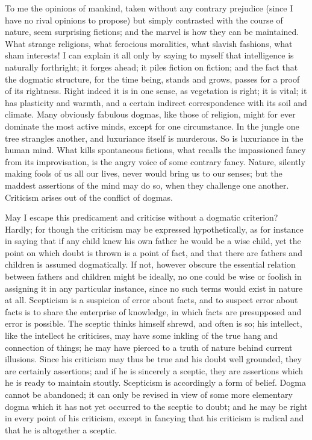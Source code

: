 To me the opinions of mankind, taken without any contrary prejudice
(since I have no rival opinions to propose) but simply contrasted with
the course of nature, seem surprising fictions; and the marvel is how
they can be maintained. What strange religions, what ferocious
moralities, what slavish fashions, what sham interests! I can explain
it all only by saying to myself that intelligence is naturally
forthright; it forges ahead; it piles fiction on fiction; and the fact
that the dogmatic structure, for the time being, stands and grows,
passes for a proof of its rightness. Right indeed it is in one sense,
as vegetation is right; it is vital; it has plasticity and warmth, and
a certain  indirect correspondence with its soil and climate.
Many obviously fabulous dogmas, like those of religion, might for ever
dominate the most active minds, except for one circumstance. In the
jungle one tree strangles another, and luxuriance itself is murderous.
So is luxuriance in the human mind. What kills spontaneous fictions,
what recalls the impassioned fancy from its improvisation, is the
angry voice of some contrary fancy. Nature, silently making fools of
us all our lives, never would bring us to our senses; but the maddest
assertions of the mind may do so, when they challenge one another.
Criticism arises out of the conflict of dogmas.

May I escape this predicament and criticise without a dogmatic
criterion? Hardly; for though the criticism may be expressed
hypothetically, as for instance in saying that if any child knew his
own father he would be a wise child, yet the point on which doubt is
thrown is a point of fact, and that there are fathers and children is
assumed dogmatically. If not, however obscure the essential relation
between fathers and children might be ideally, no one could be wise or
foolish in assigning it in any particular instance, since no such
terms would exist in nature at all. Scepticism is a suspicion of error
about facts, and to suspect error about facts is to share the
enterprise of knowledge, in which facts are presupposed and error is
possible. The sceptic thinks himself shrewd, and often is so; his
intellect, like the intellect he criticises, may have some inkling of
the true hang and connection of things; he may have pierced to a truth
of nature behind current illusions. Since his criticism may thus be
true and his doubt well grounded, they are certainly assertions; and
if he is sincerely a sceptic, they are assertions which he is ready to
maintain stoutly. Scepticism is accordingly a form of belief. Dogma
cannot be abandoned; it can only  be revised in view of some
more elementary dogma which it has not yet occurred to the sceptic to
doubt; and he may be right in every point of his criticism, except in
fancying that his criticism is radical and that he is altogether a
sceptic.

